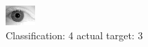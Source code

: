 \begin{figure}[h!]
\begin{center}
\includegraphics[width=0.60\columnwidth]{figures/ID2105_class_4_target_3.png}
\end{center}
\caption{ Classification: 4 actual target: 3}
\label{fig:ID2105_class_4_target_3}
\end{figure}
